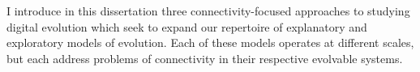 I introduce in this dissertation three connectivity-focused approaches to studying digital evolution which seek to expand our repertoire of explanatory and exploratory models of evolution. Each of these models operates at different scales, but each address problems of connectivity in their respective evolvable systems.  